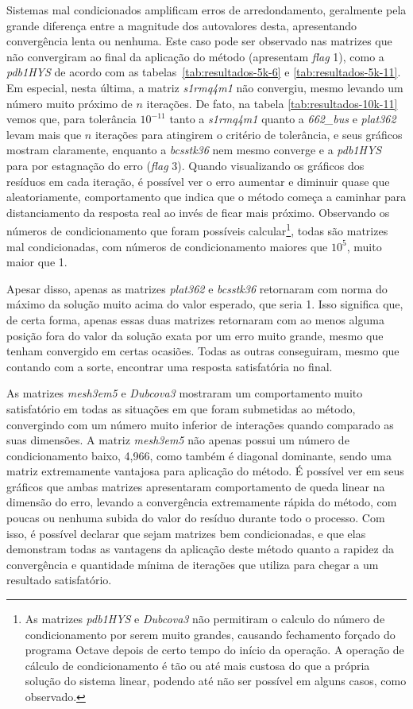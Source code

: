 \documentclass{article}
\begin{document}
Sistemas mal condicionados amplificam erros de arredondamento, geralmente pela grande diferença entre a magnitude dos autovalores desta, apresentando convergência lenta ou nenhuma. Este caso pode ser observado nas matrizes que não convergiram ao final da aplicação do método (apresentam \textit{flag} 1), como a \textit{pdb1HYS} de acordo com as tabelas~\ref{tab:resultados-5k-6} e \ref{tab:resultados-5k-11}. Em especial, nesta última, a matriz \textit{s1rmq4m1} não convergiu, mesmo levando um número muito próximo de $n$ iterações. De fato, na tabela \ref{tab:resultados-10k-11} vemos que, para tolerância $10^{-11}$ tanto a \textit{s1rmq4m1} quanto a \textit{662\_bus} e \textit{plat362} levam mais que $n$ iterações para atingirem o critério de tolerância, e seus gráficos mostram claramente, enquanto a \textit{bcsstk36} nem mesmo converge e a \textit{pdb1HYS} para por estagnação do erro (\textit{flag} 3). Quando visualizando os gráficos dos resíduos em cada iteração, é possível ver o erro aumentar e diminuir quase que aleatoriamente, comportamento que indica que o método começa a caminhar para distanciamento da resposta real ao invés de ficar mais próximo. Observando os números de condicionamento que foram possíveis calcular\footnote{As matrizes \textit{pdb1HYS} e \textit{Dubcova3} não permitiram o calculo do número de condicionamento por serem muito grandes, causando fechamento forçado do programa Octave depois de certo tempo do início da operação. A operação de cálculo de condicionamento é tão ou até mais custosa do que a própria solução do sistema linear, podendo até não ser possível em alguns casos, como observado.}, todas são matrizes mal condicionadas, com números de condicionamento maiores que $10^5$, muito maior que 1.

Apesar disso, apenas as matrizes \textit{plat362} e \textit{bcsstk36} retornaram com norma do máximo da solução muito acima do valor esperado, que seria 1. Isso significa que, de certa forma, apenas essas duas matrizes retornaram com ao menos alguma posição fora do valor da solução exata por um erro muito grande, mesmo que tenham convergido em certas ocasiões. Todas as outras conseguiram, mesmo que contando com a sorte, encontrar uma resposta satisfatória no final.

As matrizes \textit{mesh3em5} e \textit{Dubcova3} mostraram um comportamento muito satisfatório em todas as situações em que foram submetidas ao método, convergindo com um número muito inferior de interações quando comparado as suas dimensões. A matriz \textit{mesh3em5} não apenas possui um número de condicionamento baixo, 4,966, como também é diagonal dominante, sendo uma matriz extremamente vantajosa para aplicação do método. É possível ver em seus gráficos que ambas matrizes apresentaram comportamento de queda linear na dimensão do erro, levando a convergência extremamente rápida do método, com poucas ou nenhuma subida do valor do resíduo durante todo o processo. Com isso, é possível declarar que sejam matrizes bem condicionadas, e que elas demonstram todas as vantagens da aplicação deste método quanto a rapidez da convergência e quantidade mínima de iterações que utiliza para chegar a um resultado satisfatório.
\end{document}
